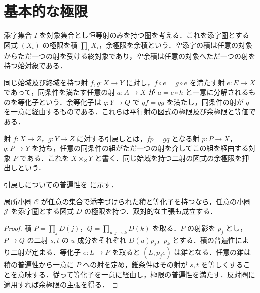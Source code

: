 \section{基本的な極限}
\begin{defn}[圏における積と余積]
添字集合 $I$ を対象集合とし恒等射のみを持つ圏を考える．これを添字圏とする図式 $(X_i)$ の極限を積 $\prod_iX_i$，余極限を余積という．空添字の積は任意の対象からただ一つの射を受ける終対象であり，空余積は任意の対象へただ一つの射を持つ始対象である．
\end{defn}
\begin{defn}[等化子と余等化子]
同じ始域及び終域を持つ射 $f,g:X\to Y$ に対し，$f\circ e=g\circ e$ を満たす射 $e:E\to X$ であって，同条件を満たす任意の射 $a:A\to X$ が $a=e\circ h$ と一意に分解されるものを等化子という．余等化子は $q:Y\to Q$ で $qf=qg$ を満たし，同条件の射が $q$ を一意に経由するものである．これらは平行射の図式の極限及び余極限と等価である．
\end{defn}
\begin{defn}[引戻しと押出し]
射 $f:X\to Z$，$g:Y\to Z$ に対する引戻しとは，$fp=gq$ となる射 $p:P\to X$，$q:P\to Y$ を持ち，任意の同条件の組がただ一つの射を介してこの組を経由する対象 $P$ である．これを $X\times_ZY$ と書く．同じ始域を持つ二射の図式の余極限を押出しという．
\end{defn}
引戻しについての普遍性を  に示す．
\begin{prop}[積と等化子からの極限]
局所小圏 $\mathcal C$ が任意の集合で添字づけられた積と等化子を持つなら，任意の小圏 $\mathcal J$ を添字圏とする図式 $D$ の極限を持つ．双対的な主張も成立する．
\end{prop}
\begin{proof}
積 $P=\prod_j D(j)$，$Q=\prod_{u:j\to k}D(k)$ を取る．$P$ の射影を $p_j$ とし，$P\to Q$ の二射 $s,t$ の $u$ 成分をそれぞれ $D(u)p_j$，$p_k$ とする．積の普遍性により二射が定まる．等化子 $e:L\to P$ を取ると $(L,p_je)$ は錐となる．任意の錐は積の普遍性から一意に $P$ への射を定め，錐条件はその射が $s,t$ を等しくすることを意味する．従って等化子を一意に経由し，極限の普遍性を満たす．反対圏に適用すれば余極限の主張を得る．
\end{proof}
